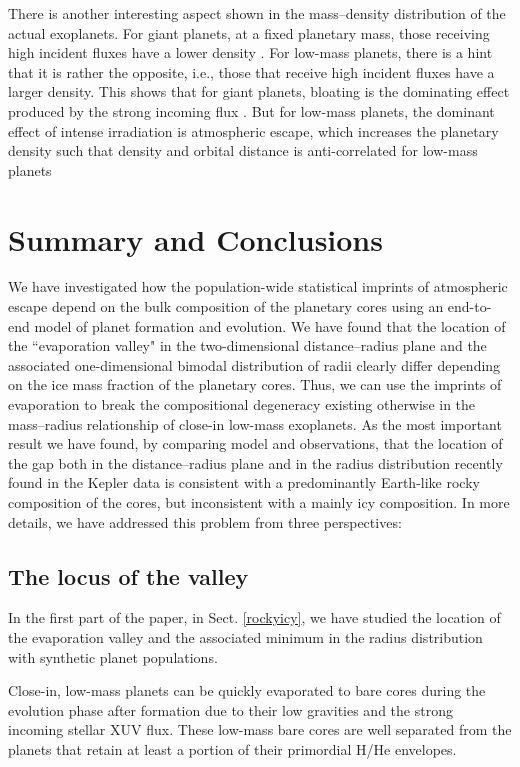 \documentclass[]{emulateapj}
\begin{document}
There is another interesting aspect shown in the mass--density distribution of the actual exoplanets. For giant planets, at a fixed planetary mass, those receiving high incident fluxes have a lower density {\citep[e.g.,][]{Laughlin2011}}. For low-mass planets, there is a hint that it is rather the opposite, i.e., those {that} receive high incident fluxes have a larger density. This shows that for giant planets, bloating is the dominating effect produced by the strong incoming flux {\citep[e.g.,][]{Thorngren2017}}. But for low-mass planets, the dominant effect of intense irradiation is atmospheric escape, which increases the planetary density such that density and orbital distance is anti-correlated for low-mass planets

\section{Summary and Conclusions}\label{discussion}
We have investigated how the population-wide statistical imprints of atmospheric escape depend on the bulk composition of the planetary cores using an end-to-end model of planet formation and evolution.  We have found that the location of the ``evaporation valley"  in the two-dimensional distance--radius plane and the associated one-dimensional bimodal distribution of radii \citep{Owen2013,Lopez2013,Jin2014,ChenRogers2016} clearly differ depending on the ice mass fraction of the planetary cores. Thus, we can use the imprints of evaporation  to break the compositional degeneracy existing otherwise in the mass--radius relationship of close-in low-mass exoplanets.  As the most important result we have found, by comparing model and observations, that the location of the gap both in the distance--radius plane and {in} the radius distribution recently found in the Kepler data \citep{Fulton2017} is consistent with a predominantly {Earth-like} rocky composition of the cores, but inconsistent with a mainly icy composition. In more details, we have  addressed this problem from three perspectives:

\subsection{{The locus of the valley}}
In the first part of the paper, in Sect. \ref{rockyicy},  we have studied the location of the evaporation valley and the associated minimum in the radius distribution with synthetic planet populations. 

Close-in, low-mass planets can be quickly evaporated to bare cores during the evolution phase after formation due to their low gravities and the strong incoming stellar XUV flux. These low-mass bare cores are well separated from the planets that retain at least a portion of their primordial H/He envelopes.
\end{document}
